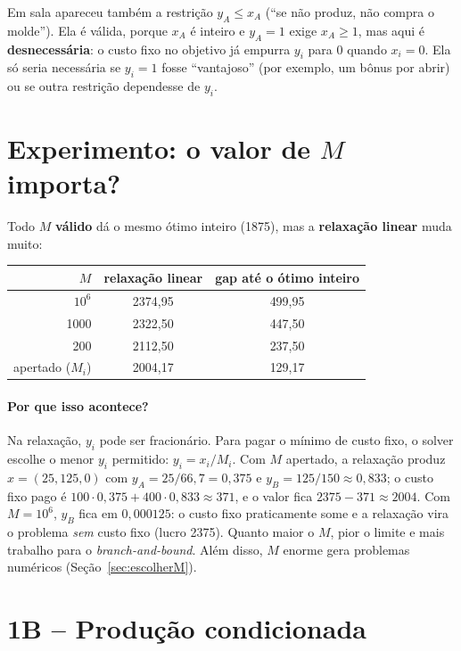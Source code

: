 \begin{atencao}[e a restrição $y_i\le x_i$?]
Em sala apareceu também a restrição $y_A\le x_A$ (``se não produz, não compra o molde''). Ela é válida, porque
$x_A$ é inteiro e $y_A=1$ exige $x_A\ge1$, mas aqui é \textbf{desnecessária}: o custo fixo no objetivo já empurra
$y_i$ para 0 quando $x_i=0$. Ela só seria necessária se $y_i=1$ fosse ``vantajoso'' (por exemplo, um bônus por
abrir) ou se outra restrição dependesse de $y_i$.
\end{atencao}

\section{Experimento: o valor de $M$ importa?}

Todo $M$ \textbf{válido} dá o mesmo ótimo inteiro (1875), mas a \textbf{relaxação linear} muda muito:
\begin{center}
\begin{tabular}{rcc}
\toprule
$M$ & relaxação linear & gap até o ótimo inteiro\\
\midrule
$10^6$ & 2374,95 & 499,95\\
1000 & 2322,50 & 447,50\\
200 & 2112,50 & 237,50\\
apertado ($M_i$) & 2004,17 & 129,17\\
\bottomrule
\end{tabular}
\end{center}

\paragraph{Por que isso acontece?} Na relaxação, $y_i$ pode ser fracionário. Para pagar o mínimo de custo fixo, o
solver escolhe o menor $y_i$ permitido: $y_i=x_i/M_i$. Com $M$ apertado, a relaxação produz $x=(25,125,0)$ com
$y_A=25/66{,}7=0{,}375$ e $y_B=125/150\approx0{,}833$; o custo fixo pago é
$100\cdot0{,}375+400\cdot0{,}833\approx371$, e o valor fica $2375-371\approx2004$. Com $M=10^6$, $y_B$ fica em
$0{,}000125$: o custo fixo praticamente some e a relaxação vira o problema \emph{sem} custo fixo (lucro 2375).
Quanto maior o $M$, pior o limite e mais trabalho para o \emph{branch-and-bound}. Além disso, $M$ enorme gera
problemas numéricos (Seção~\ref{sec:escolherM}).

\section{1B -- Produção condicionada}

